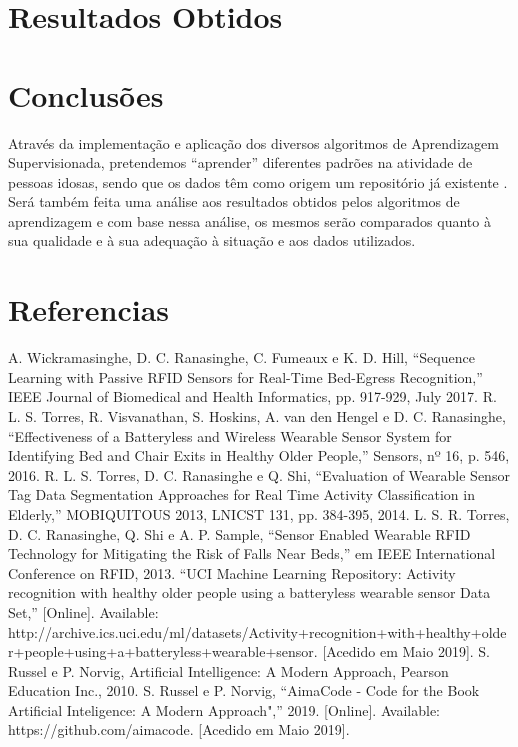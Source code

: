 \documentclass[conference]{IEEEtran}
\begin{document}
\section{Resultados Obtidos}



\section{Conclusões}

Através da implementação e aplicação dos diversos algoritmos de Aprendizagem Supervisionada, pretendemos “aprender” diferentes padrões na atividade de pessoas idosas, sendo que os dados têm como origem um repositório já existente \cite{b5}. 
Será também feita uma análise aos resultados obtidos pelos algoritmos de aprendizagem e com base nessa análise, os mesmos serão comparados quanto à sua qualidade e à sua adequação à situação e aos dados utilizados.  


\section*{Referencias}


\begin{thebibliography}{00}
 A. Wickramasinghe, D. C. Ranasinghe, C. Fumeaux e K. D. Hill, “Sequence Learning with Passive RFID Sensors for Real-Time Bed-Egress Recognition,” IEEE Journal of Biomedical and Health Informatics, pp. 917-929, July 2017.
 R. L. S. Torres, R. Visvanathan, S. Hoskins, A. van den Hengel e D. C. Ranasinghe, “Effectiveness of a Batteryless and Wireless Wearable Sensor System for Identifying Bed and Chair Exits in Healthy Older People,” Sensors, nº 16, p. 546, 2016. 
R. L. S. Torres, D. C. Ranasinghe e Q. Shi, “Evaluation of Wearable Sensor Tag Data Segmentation Approaches for Real Time Activity Classification in Elderly,” MOBIQUITOUS 2013, LNICST 131, pp. 384-395, 2014. 
 L. S. R. Torres, D. C. Ranasinghe, Q. Shi e A. P. Sample, “Sensor Enabled Wearable RFID Technology for Mitigating the Risk of Falls Near Beds,” em IEEE International Conference on RFID, 2013. 
 “UCI Machine Learning Repository: Activity recognition with healthy older people using a batteryless wearable sensor Data Set,” [Online]. Available: http://archive.ics.uci.edu/ml/datasets/Activity+recognition+with+heal\-thy+older+people+using+a+batteryless+wearable+sensor. [Acedido em Maio 2019].
 S. Russel e P. Norvig, Artificial Intelligence: A Modern Approach, Pearson Education Inc., 2010.
 S. Russel e P. Norvig, “AimaCode - Code for the Book Artificial Inteligence: A Modern Approach",” 2019. [Online]. Available: https://github.com/aimacode. [Acedido em Maio 2019].








\end{thebibliography}
\end{document}

